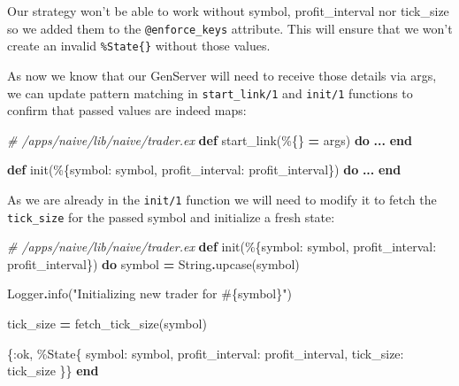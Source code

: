 \documentclass[
]{book}
\newenvironment{Shaded}{\begin{snugshade}}{\end{snugshade}}
\newcommand{\CommentTok}[1]{\textcolor[rgb]{0.56,0.35,0.01}{\textit{#1}}}
\newcommand{\ConstantTok}[1]{\textcolor[rgb]{0.00,0.00,0.00}{#1}}
\newcommand{\KeywordTok}[1]{\textcolor[rgb]{0.13,0.29,0.53}{\textbf{#1}}}
\newcommand{\NormalTok}[1]{#1}
\newcommand{\OperatorTok}[1]{\textcolor[rgb]{0.81,0.36,0.00}{\textbf{#1}}}
\newcommand{\OtherTok}[1]{\textcolor[rgb]{0.56,0.35,0.01}{#1}}
\newcommand{\StringTok}[1]{\textcolor[rgb]{0.31,0.60,0.02}{#1}}
\newcommand{\VariableTok}[1]{\textcolor[rgb]{0.00,0.00,0.00}{#1}}
\begin{document}
Our strategy won't be able to work without symbol, profit\_interval nor tick\_size so we added them to the \texttt{@enforce\_keys} attribute. This will ensure that we won't create an invalid \texttt{\%State\{\}} without those values.

As now we know that our GenServer will need to receive those details via args, we can update pattern matching in \texttt{start\_link/1} and \texttt{init/1} functions to confirm that passed values are indeed maps:

\begin{Shaded}
\begin{Highlighting}[]
  \CommentTok{\# /apps/naive/lib/naive/trader.ex}
  \KeywordTok{def}\NormalTok{ start\_link(\%\{\} }\OperatorTok{=}\NormalTok{ args) }\KeywordTok{do}
    \OperatorTok{...}
  \KeywordTok{end}

  \KeywordTok{def}\NormalTok{ init(\%\{}\VariableTok{symbol:}\NormalTok{ symbol, }\VariableTok{profit\_interval:}\NormalTok{ profit\_interval\}) }\KeywordTok{do}
    \OperatorTok{...}
  \KeywordTok{end}
\end{Highlighting}
\end{Shaded}

As we are already in the \texttt{init/1} function we will need to modify it to fetch the \texttt{tick\_size} for the passed symbol and initialize a fresh state:

\begin{Shaded}
\begin{Highlighting}[]
  \CommentTok{\# /apps/naive/lib/naive/trader.ex}
  \KeywordTok{def}\NormalTok{ init(\%\{}\VariableTok{symbol:}\NormalTok{ symbol, }\VariableTok{profit\_interval:}\NormalTok{ profit\_interval\}) }\KeywordTok{do}
\NormalTok{    symbol }\OperatorTok{=} \ConstantTok{String}\OperatorTok{.}\NormalTok{upcase(symbol)}

    \ConstantTok{Logger}\OperatorTok{.}\NormalTok{info(}\StringTok{"Initializing new trader for }\OtherTok{\#\{}\NormalTok{symbol}\OtherTok{\}}\StringTok{"}\NormalTok{)}

\NormalTok{    tick\_size }\OperatorTok{=}\NormalTok{ fetch\_tick\_size(symbol)}

\NormalTok{    \{}\VariableTok{:ok}\NormalTok{,}
\NormalTok{     \%}\ConstantTok{State}\NormalTok{\{}
       \VariableTok{symbol:}\NormalTok{ symbol,}
       \VariableTok{profit\_interval:}\NormalTok{ profit\_interval,}
       \VariableTok{tick\_size:}\NormalTok{ tick\_size}
\NormalTok{     \}\}}
  \KeywordTok{end}
\end{Highlighting}
\end{Shaded}
\end{document}
